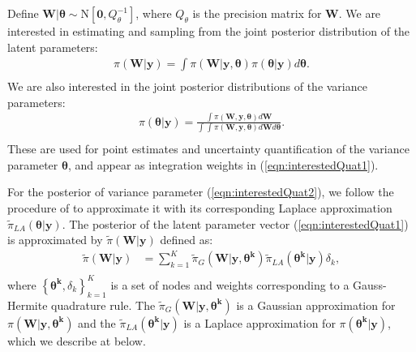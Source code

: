 \documentclass[ba]{imsart}
\begin{document}
Define $\boldsymbol{W}|\boldsymbol{\theta}\sim\text{N}\left[\boldsymbol{0}, Q^{-1}_{\theta}\right]$, where $Q_{\theta}$ is the precision matrix for $\boldsymbol{W}$. 
We are interested in estimating and sampling from the joint posterior distribution of the latent parameters:
\begin{equation}\begin{aligned}\label{eqn:interestedQuat1}
\pi(\boldsymbol{W}|\boldsymbol{y}) = \int \pi(\boldsymbol{W}|\boldsymbol{y},\boldsymbol{\theta}) \pi(\boldsymbol{\theta}|\boldsymbol{y}) d\boldsymbol{\theta} .  \\
\end{aligned}\end{equation}
We are also interested in the joint posterior distributions of the variance parameters:
\begin{equation}\begin{aligned}\label{eqn:interestedQuat2}
\pi(\boldsymbol{\theta}|\boldsymbol{y}) = \frac{\int \pi(\boldsymbol{W},\boldsymbol{y},\boldsymbol{\theta}) d\boldsymbol{W}}{\int_{} \int_{} \pi(\boldsymbol{W},\boldsymbol{y}, \boldsymbol{\theta}) d\boldsymbol{W} d\boldsymbol{\theta} } . \\
\end{aligned}\end{equation}
These are used for point estimates and uncertainty quantification of the variance parameter $\boldsymbol{\theta}$, and appear as integration weights in (\ref{eqn:interestedQuat1}). 


For the posterior of variance parameter (\ref{eqn:interestedQuat2}), we follow the procedure of \cite{casecross} to approximate it with its corresponding Laplace approximation $\tilde{\pi}_{LA}(\boldsymbol{\theta}|\boldsymbol{y})$. The posterior of the latent parameter vector (\ref{eqn:interestedQuat1}) is approximated by $\tilde{\pi}(\boldsymbol{W}|\boldsymbol{y})$ defined as:
\begin{equation}\begin{aligned}\label{eqn:integration}
\tilde{\pi}(\boldsymbol{W}|\boldsymbol{y}) &= \sum_{k=1}^{K}
\tilde{\pi}_{G}(\boldsymbol{W}|\boldsymbol{y},\boldsymbol{\theta^{k}})
\tilde{\pi}_{LA}(\boldsymbol{\theta^{k}}|\boldsymbol{y})\delta_{k} , \\
\end{aligned}\end{equation}
where $\left\{\boldsymbol{\theta^{k}},\delta_{k}\right\}_{k=1}^{K}$ is a set of nodes and weights corresponding to a Gauss-Hermite quadrature rule. The $\tilde{\pi}_{G}(\boldsymbol{W}|\boldsymbol{y},\boldsymbol{\theta^{k}})$ is a Gaussian approximation for $\pi(\boldsymbol{W}|\boldsymbol{y},\boldsymbol{\theta^{k}})$ and the $\tilde{\pi}_{LA}(\boldsymbol{\theta^{k}}|\boldsymbol{y})$ is a Laplace approximation for $\pi(\boldsymbol{\theta^{k}}|\boldsymbol{y})$, which we describe at below.
\end{document}
